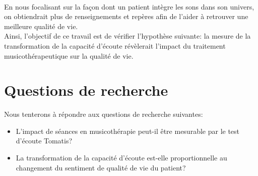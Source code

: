   \\
  En nous focalisant sur la façon dont un patient intègre les sons dans son univers, %
   on obtiendrait plus de renseignements et repères afin de l'aider à 
  retrouver  une 
  meilleure qualité de vie.
 \\
Ainsi, l'objectif de ce travail est de vérifier l'hypothèse suivante:  la  mesure de la  
transformation de la capacité d'écoute révèlerait l'impact  du traitement 
musicothérapeutique sur la qualité de vie.

\section*{Questions de recherche}

Nous tenterons à 
répondre aux questions de recherche suivantes: 

\begin{itemize}
	\item L'impact de séances en musicothérapie  peut-il être mesurable par le test 
	d'écoute Tomatis\textsuperscript \textregistered?
	\item La transformation de la capacité d'écoute est-elle  proportionnelle au changement 
	du sentiment de qualité de vie du patient?
\end{itemize}

